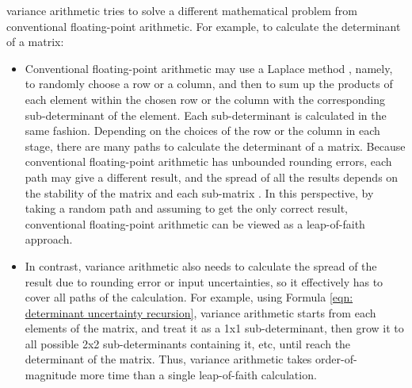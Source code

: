 \documentclass[twoside]{article}
\numberwithin{equation}{section}
\begin{document}
variance arithmetic tries to solve a different mathematical problem from conventional floating-point arithmetic. For example, to calculate the determinant of a matrix:
\begin{itemize}
\item Conventional floating-point arithmetic may use a Laplace method \cite{Numerical_Recipes}, namely, to randomly choose a row or a column, and then to sum up the products of each element within the chosen row or the column with the corresponding sub-determinant of the element. Each sub-determinant is calculated in the same fashion.  Depending on the choices of the row or the column in each stage, there are many paths to calculate the determinant of a matrix.  Because conventional floating-point arithmetic has unbounded rounding errors, each path may give a different result, and the spread of all the results depends on the stability of the matrix and each sub-matrix \cite{Condition_Number}.  In this perspective, by taking a random path and assuming to get the only correct result, conventional floating-point arithmetic can be viewed as a leap-of-faith approach.

\item In contrast, variance arithmetic also needs to calculate the spread of the result due to rounding error or input uncertainties, so it effectively has to cover all paths of the calculation.  For example, using Formula \eqref{eqn: determinant uncertainty recursion}, variance arithmetic starts from each elements of the matrix, and treat it as a 1x1 sub-determinant, then grow it to all possible 2x2 sub-determinants containing it, etc, until reach the determinant of the matrix.  Thus, variance arithmetic takes order-of-magnitude more time than a single leap-of-faith calculation.  
\end{itemize}   
\end{document}
